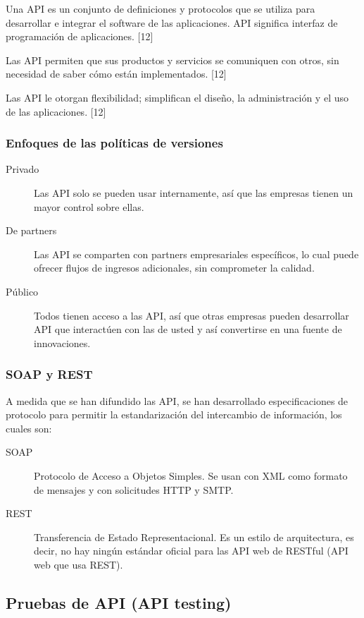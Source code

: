 \documentclass[twoside,twocolumn]{article}
\begin{document}
Una API es un conjunto de definiciones y protocolos que se utiliza para desarrollar e integrar el software de las aplicaciones. API significa interfaz de programación de aplicaciones. [12]

Las API permiten que sus productos y servicios se comuniquen con otros, sin necesidad de saber cómo están implementados. [12]

Las API le otorgan flexibilidad; simplifican el diseño, la administración y el uso de las aplicaciones. [12]

\subsubsection{Enfoques de las políticas de versiones}

\begin{description}
  \item[Privado]
   Las API solo se pueden usar internamente, así que las empresas tienen un mayor control sobre ellas.
  \item[De partners]
  Las API se comparten con partners empresariales específicos, lo cual puede ofrecer flujos de ingresos adicionales, sin comprometer la calidad.
  \item[Público]
  Todos tienen acceso a las API, así que otras empresas pueden desarrollar API que interactúen con las de usted y así convertirse en una fuente de innovaciones.
\end{description}

\subsubsection{SOAP y REST}

A medida que se han difundido las API, se han desarrollado especificaciones de protocolo para permitir la estandarización del intercambio de información, los cuales son:

\begin{description}
  \item[SOAP] Protocolo de Acceso a Objetos Simples. Se usan con XML como formato de mensajes y con solicitudes HTTP y SMTP.
  \item[REST] Transferencia de Estado Representacional. Es un estilo de arquitectura, es decir, no hay ningún estándar oficial para las API web de RESTful (API web que usa REST).
\end{description}

\subsection{Pruebas de API (API testing)}
\end{document}
